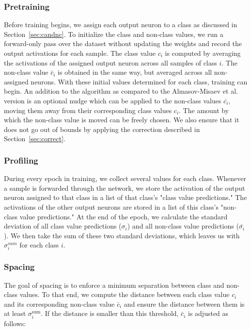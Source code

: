 \documentclass[12pt,fleqn,a4paper]{article}
\begin{document}
\subsubsection{Pretraining}
Before training begins, we assign each output neuron to a class as discussed in Section~\ref{sec:candnc}. To initialize the class and non-class values, we run a forward-only pass over the dataset without updating the weights and record the output activations for each sample. The class value $c_i$ is computed by averaging the activations of the assigned output neuron across all samples of class $i$. The non-class value $\bar{c}_i$ is obtained in the same way, but averaged across all non-assigned neurons. With these initial values determined for each class, training can begin. An addition to the algorithm as compared to the Almasov-Misaev et al. version is an optional nudge which can be applied to the non-class values $\bar{c_i}$, moving them away from their corresponding class values $c_i$. The amount by which the non-class value is moved can be freely chosen. We also ensure that it does not go out of bounds by applying the correction described in Section~\ref{sec:correct}.

\subsubsection{Profiling}
During every epoch in training, we collect several values for each class. Whenever a sample is forwarded through the network, we store the activation of the output neuron assigned to that class in a list of that class's "class value predictions." The activations of the other output neurons are stored in a list of this class's "non-class value predictions." At the end of the epoch, we calculate the standard deviation of all class value predictions ($\sigma_i$) and all non-class value predictions ($\bar{\sigma_i}$). We then take the sum of these two standard deviations, which leaves us with $\sigma^{sum}_i$ for each class $i$.

\subsubsection{Spacing}\label{sec:spacing}
The goal of spacing is to enforce a minimum separation between class and non-class values. To that end, we compute the distance between each class value $c_i$ and its corresponding non-class value $\bar{c}_i$ and ensure the distance between them is at least $\sigma^{\text{sum}}_i$. If the distance is smaller than this threshold, $\bar{c}_i$ is adjusted as follows:
\end{document}
